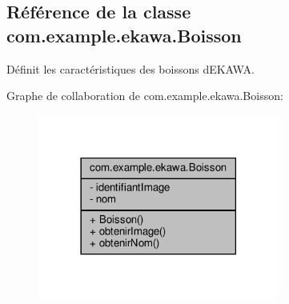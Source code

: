 \hypertarget{classcom_1_1example_1_1ekawa_1_1_boisson}{}\subsection{Référence de la classe com.\+example.\+ekawa.\+Boisson}
\label{classcom_1_1example_1_1ekawa_1_1_boisson}


Définit les caractéristiques des boissons d\textquotesingle{}E\+K\+A\+WA.  




Graphe de collaboration de com.\+example.\+ekawa.\+Boisson\+:\nopagebreak
\begin{figure}[H]
\begin{center}
\leavevmode
\includegraphics[width=225pt]{classcom_1_1example_1_1ekawa_1_1_boisson__coll__graph}
\end{center}
\end{figure}
